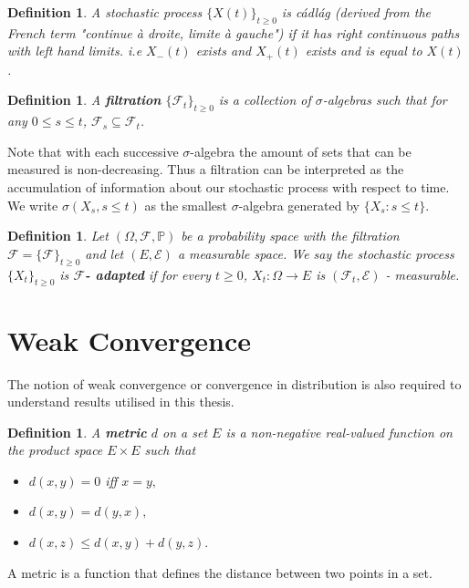 \documentclass[honours,12pt]{UNSWthesis}
\newcommand{\PP}{\mathbb{P}}
\newcommand{\1}{\mathbf 1}
\newcommand{\FF}{\mathcal{F}}
\newtheorem{definition}[theorem]{Definition}
\numberwithin{equation}{section}
\theoremstyle{definition}
\theoremstyle{remark}
\begin{document}
\begin{definition}
A stochastic process $\{X(t)\}_{t\geq 0}$ is c\'{a}dl\'{a}g (derived from the French term "continue à droite, limite à gauche") if it has right continuous paths with left hand limits. i.e	$X_-(t)$ exists and $X_+(t)$ exists and is equal to $X(t)$.\\
\end{definition}

\begin{definition}
A \textbf{filtration} $\{\FF_t\}_{t\geq 0}$ is a collection of $\sigma$-algebras such that for any $0\leq s \leq t$, $\FF_s \subseteq \FF_t$.\\
\end{definition}

{\noindent}Note that with each successive $\sigma$-algebra the amount of sets that can be measured is non-decreasing. Thus a filtration can be interpreted as the accumulation of information about our stochastic process with respect to time. We write $\sigma(X_s,s\leq t)$ as the smallest $\sigma$-algebra generated by $\{X_s: s\leq t\}$.\\

\begin{definition}
Let $(\Omega,\FF,\PP)$ be a probability space with the filtration $\FF = \{\FF\}_{t\geq 0}$ and let $(E,\mathcal{E})$ a measurable space. We say the stochastic process $\{X_t\}_{t\geq 0}$ is $\boldsymbol{\FF}$\textbf{- adapted} if for every $t\geq 0$, $X_t: \Omega \rightarrow E$ is $(\FF_t, \mathcal{E})$ - measurable.\\
\end{definition}

\section{Weak Convergence}
The notion of weak convergence or convergence in distribution is also required to understand results utilised in this thesis.\\

\begin{definition}
A \textbf{metric} $d$ on a set $E$ is a non-negative real-valued function on the product space $E\times E$ such that
	\begin{itemize}
		\item $d(x,y)=0$ iff $x=y,$
		\item $d(x,y)=d(y,x),$
		\item $d(x,z) \leq d(x,y)+d(y,z).$
	\end{itemize}
\end{definition}
\noindent A metric is a function that defines the distance between two points in a set.\\
\end{document}

